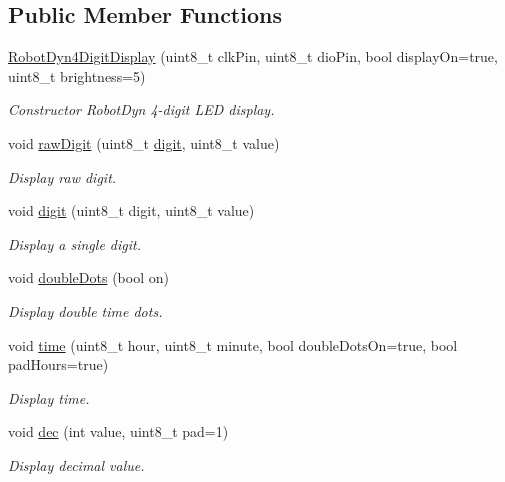 \subsection*{Public Member Functions}
\begin{DoxyCompactItemize}
\item 
\hyperlink{class_robot_dyn4_digit_display_ad4240ac103a42b221593fb0110aa8032}{Robot\+Dyn4\+Digit\+Display} (uint8\+\_\+t clk\+Pin, uint8\+\_\+t dio\+Pin, bool display\+On=true, uint8\+\_\+t brightness=5)
\begin{DoxyCompactList}\small\item\em Constructor Robot\+Dyn 4-\/digit L\+ED display. \end{DoxyCompactList}\item 
void \hyperlink{class_robot_dyn4_digit_display_a7f990760be0a939de2e97c323f93e91a}{raw\+Digit} (uint8\+\_\+t \hyperlink{class_robot_dyn4_digit_display_aa0a682be1d560c1c93f547539b971806}{digit}, uint8\+\_\+t value)
\begin{DoxyCompactList}\small\item\em Display raw digit. \end{DoxyCompactList}\item 
void \hyperlink{class_robot_dyn4_digit_display_aa0a682be1d560c1c93f547539b971806}{digit} (uint8\+\_\+t digit, uint8\+\_\+t value)
\begin{DoxyCompactList}\small\item\em Display a single digit. \end{DoxyCompactList}\item 
void \hyperlink{class_robot_dyn4_digit_display_a1906505c29cfcb7baa7f4b9162301f6e}{double\+Dots} (bool on)
\begin{DoxyCompactList}\small\item\em Display double time dots. \end{DoxyCompactList}\item 
void \hyperlink{class_robot_dyn4_digit_display_aa7382284633fff676ae746f0270024bd}{time} (uint8\+\_\+t hour, uint8\+\_\+t minute, bool double\+Dots\+On=true, bool pad\+Hours=true)
\begin{DoxyCompactList}\small\item\em Display time. \end{DoxyCompactList}\item 
void \hyperlink{class_robot_dyn4_digit_display_af99a7b39a0e4dc6bfa8d1fef6a835651}{dec} (int value, uint8\+\_\+t pad=1)
\begin{DoxyCompactList}\small\item\em Display decimal value. \end{DoxyCompactList}\item 

\end{DoxyCompactItemize}
